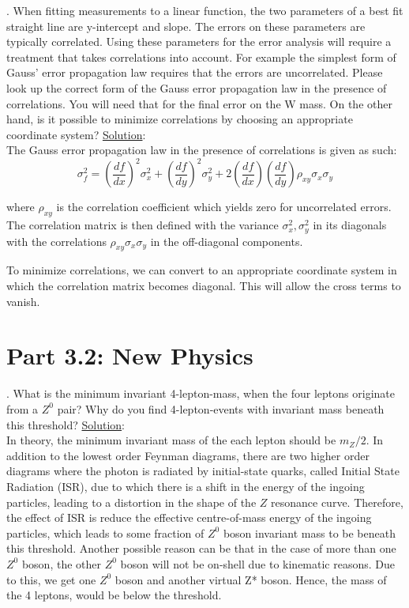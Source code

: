 \documentclass[a4paper]{report}
\numberwithin{equation}{section}
\begin{document}
.  When fitting measurements to a linear function, the two parameters of a best fit straight line are y-intercept and slope. The errors on these parameters are typically correlated. Using these parameters for the error analysis will require a treatment that takes correlations into account. For example the simplest form of Gauss’ error propagation law requires that the errors are uncorrelated. Please look up the correct form of the Gauss error propagation law in the presence of correlations. You will need that for the final error on the W mass. On the other hand, is it possible to minimize correlations by choosing an appropriate coordinate system?
\bigbreak
\noindent \underline{Solution}: \\
\noindent The Gauss error propagation law in the presence of correlations is given as such:
$$
	\sigma_f ^2 = \left( \frac{df}{dx} \right)^2 \sigma_x^2 + \left( \frac{df}{dy} \right)^2 \sigma_y^2 + 2 \left( \frac{df}{dx} \right) \left( \frac{df}{dy} \right) \rho_{xy} \sigma_{x} \sigma_y $$
	
\noindent where $\rho_{xy}$ is the correlation coefficient which yields zero for uncorrelated errors. The correlation matrix is then defined with the variance $\sigma_x^2, \sigma_y^2$ in its diagonals with the correlations $\rho_{xy} \sigma_x \sigma_y$ in the off-diagonal components.

\noindent To minimize correlations, we can convert to an appropriate coordinate system in which the correlation matrix becomes diagonal. This will allow the cross terms to vanish.

\section{Part 3.2: New Physics}

. What is the minimum invariant 4-lepton-mass, when the four leptons originate from a $Z^0$ pair? Why do you find 4-lepton-events with invariant mass beneath this threshold?
\bigbreak
\noindent \underline{Solution}: \\
\noindent In theory, the minimum invariant mass of the each lepton should be $m_Z / 2$. In addition to the lowest order Feynman diagrams, there are two higher order diagrams where the photon is radiated by initial-state quarks, called Initial State Radiation (ISR), due to which there is a shift in the energy of the ingoing particles, leading to a distortion in the shape of the $Z$ resonance curve. Therefore, the effect of ISR is reduce the effective centre-of-mass energy of the ingoing particles, which leads to some fraction of $Z^0$ boson invariant mass to be beneath this threshold. 
Another possible reason can be that in the case of more than one $Z^0$ boson, the other $Z^0$ boson will not be on-shell due to kinematic reasons. Due to this, we get one $Z^0$ boson and another virtual Z* boson. Hence, the mass of the 4 leptons, would be below the threshold. 
\end{document}
